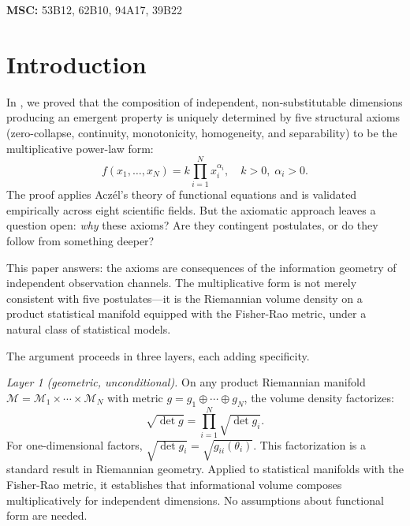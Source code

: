 \documentclass[12pt, a4paper]{article}
\theoremstyle{definition}
\theoremstyle{remark}
\begin{document}
\noindent\textbf{MSC:} 53B12, 62B10, 94A17, 39B22

\newpage\tableofcontents\newpage

\section{Introduction}\label{sec:intro}

In \cite{kirsch2026mc}, we proved that the composition of independent, non-substitutable dimensions producing an emergent property is uniquely determined by five structural axioms (zero-collapse, continuity, monotonicity, homogeneity, and separability) to be the multiplicative power-law form:
\begin{equation}\label{eq:mc}
f(x_1, \ldots, x_N) = k \prod_{i=1}^{N} x_i^{\alpha_i}, \quad k > 0, \; \alpha_i > 0.
\end{equation}
The proof applies Acz\'el's theory of functional equations \cite{aczel1966} and is validated empirically across eight scientific fields. But the axiomatic approach leaves a question open: \textit{why} these axioms? Are they contingent postulates, or do they follow from something deeper?

This paper answers: the axioms are consequences of the information geometry of independent observation channels. The multiplicative form is not merely consistent with five postulates---it is the Riemannian volume density on a product statistical manifold equipped with the Fisher-Rao metric, under a natural class of statistical models.

The argument proceeds in three layers, each adding specificity.

\textit{Layer 1 (geometric, unconditional).} On any product Riemannian manifold $\mathcal{M} = \mathcal{M}_1 \times \cdots \times \mathcal{M}_N$ with metric $g = g_1 \oplus \cdots \oplus g_N$, the volume density factorizes:
\[
\sqrt{\det g} = \prod_{i=1}^{N} \sqrt{\det g_i}.
\]
For one-dimensional factors, $\sqrt{\det g_i} = \sqrt{g_{ii}(\theta_i)}$. This factorization is a standard result in Riemannian geometry. Applied to statistical manifolds with the Fisher-Rao metric, it establishes that informational volume composes multiplicatively for independent dimensions. No assumptions about functional form are needed.
\end{document}
